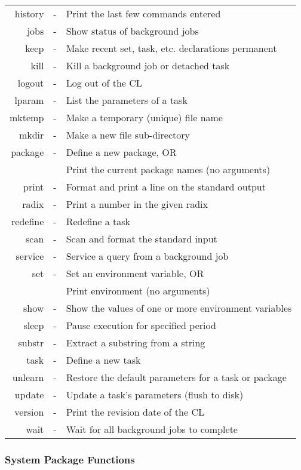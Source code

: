\begin{tabular}{rcl}
        history & - & Print the last few commands entered \\
	   jobs & - & Show status of background jobs \\
	   keep & - & Make recent set, task, etc. declarations permanent \\
	   kill & - & Kill a background job or detached task \\
	 logout & - & Log out of the CL \\
	 lparam & - & List the parameters of a task \\
	 mktemp & - & Make a temporary (unique) file name \\
	  mkdir & - & Make a new file sub-directory \\
        package & - & Define a new package, OR\\
                  & & Print the current package names (no arguments) \\
	  print & - & Format and print a line on the standard output \\
	  radix & - & Print a number in the given radix \\
       redefine & - & Redefine a task \\
	   scan & - & Scan and format the standard input \\
        service & - & Service a query from a background job \\
	    set & - & Set an environment variable, OR \\
                  & & Print environment (no arguments) \\
	   show & - & Show the values of one or more environment variables \\
	  sleep & - & Pause execution for  specified period \\
	 substr & - & Extract a substring from a string \\
	   task & - & Define a new task \\
        unlearn & - & Restore the default parameters for a task or package \\
	 update & - & Update a task's parameters (flush to disk) \\
        version & - & Print the revision date of the CL \\
	   wait & - & Wait for all background jobs to complete
\end{tabular}

\subsubsection{System Package Functions}

